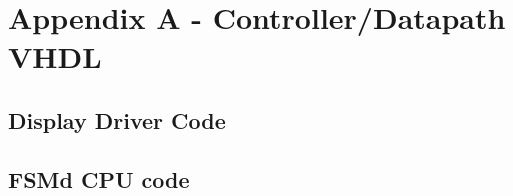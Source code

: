 \section{Appendix A - Controller/Datapath VHDL}
\subsection{Display Driver Code}









\subsection{FSMd CPU code}

